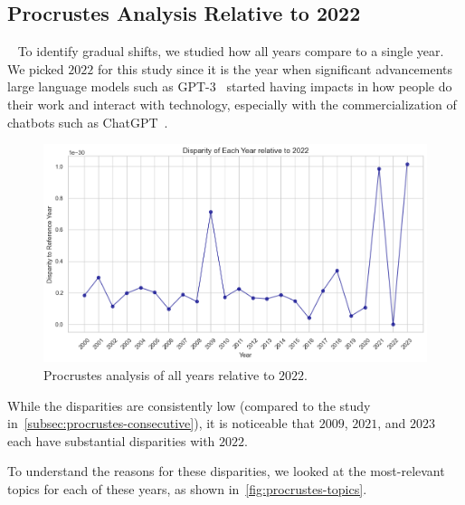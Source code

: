 \subsection{Procrustes Analysis Relative to 2022}~\label{subsec:procrustes-2022}
To identify gradual shifts, we studied how all years compare to a single year.
We picked $2022$ for this study since it is the year when significant advancements
large language models such as GPT-3~\cite{gpt3-paper} started having
impacts in how people do their work and interact with technology,
especially with the commercialization of chatbots such as
ChatGPT~\cite{chatgpt-info}.

\begin{figure}[H]
  \centering
  \includegraphics[width=\textwidth]{figures/procrustes/procrustes-2022.png}
  \caption{Procrustes analysis of all years relative to $2022$.}
  \label{fig:procrustes-2022}
\end{figure}

While the disparities are consistently low (compared to the study in~\cref{subsec:procrustes-consecutive}),
it is noticeable that $2009$, $2021$, and $2023$ each have substantial disparities with $2022$.

To understand the reasons for these disparities, we looked at the most-relevant topics
for each of these years, as shown in~\cref{fig:procrustes-topics}.

